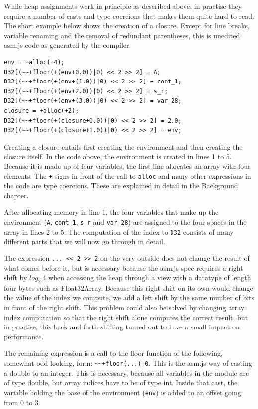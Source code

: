 \documentclass[11pt]{report}
\begin{document}
While heap assignments work in principle as described above, in practise they require a number of casts and type coercions that makes them quite hard to read. The short example below shows the creation of a closure. Except for line breaks, variable renaming and the removal of redundant parentheses, this is unedited asm.js code as generated by the compiler.

\begin{lstlisting}
env = +alloc(+4);
D32[(~~+floor(+(env+0.0))|0) << 2 >> 2] = A;
D32[(~~+floor(+(env+(1.0))|0) << 2 >> 2] = cont_1;
D32[(~~+floor(+(env+2.0))|0) << 2 >> 2] = s_r;
D32[(~~+floor(+(env+(3.0))|0) << 2 >> 2] = var_28;
closure = +alloc(+2);
D32[(~~+floor(+(closure+0.0))|0) << 2 >> 2] = 2.0;
D32[(~~+floor(+(closure+1.0))|0) << 2 >> 2] = env;
\end{lstlisting}

Creating a closure entails first creating the environment and then creating the closure itself. In the code above, the environment is created in lines 1 to 5. Because it is made up of four variables, the first line allocates an array with four elements. The \texttt{+} signs in front of the call to \texttt{alloc} and many other expressions in the code are type coercions. These are explained in detail in the Background chapter.

After allocating memory in line 1, the four variables that make up the environment (\texttt{A}, \texttt{cont_1}, \texttt{s_r} and \texttt{var_28}) are assigned to the four spaces in the array in lines 2 to 5. The computation of the index to \texttt{D32} consists of many different parts that we will now go through in detail.

The expression \texttt{... {<}< 2 {>}> 2} on the very outside does not change the result of what comes before it, but is necessary because the asm.js spec requires a right shift by $log_2~4$ when accessing the heap through a view with a datatype of length four bytes such as Float32Array. Because this right shift on its own would change the value of the index we compute, we add a left shift by the same number of bits in front of the right shift. This problem could also be solved by changing array index computation so that the right shift alone computes the correct result, but in practise, this back and forth shifting turned out to have a small impact on performance.

The remaining expression is a call to the floor function of the following, somewhat odd looking, form: \texttt{\textasciitilde\textasciitilde+floor(...)|0}. This is the asm.js way of casting a double to an integer. This is necessary, because all variables in the module are of type double, but array indices have to be of type int. Inside that cast, the variable holding the base of the environment (\texttt{env}) is added to an offset going from $0$ to $3$.
\end{document}
